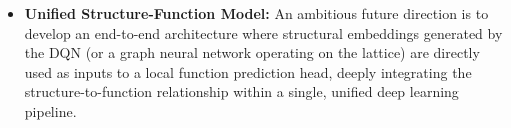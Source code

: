 \begin{itemize}
    \item \textbf{Unified Structure-Function Model:} An ambitious future direction is to develop an end-to-end architecture where structural embeddings generated by the DQN (or a graph neural network operating on the lattice) are directly used as inputs to a local function prediction head, deeply integrating the structure-to-function relationship within a single, unified deep learning pipeline.
\end{itemize}
